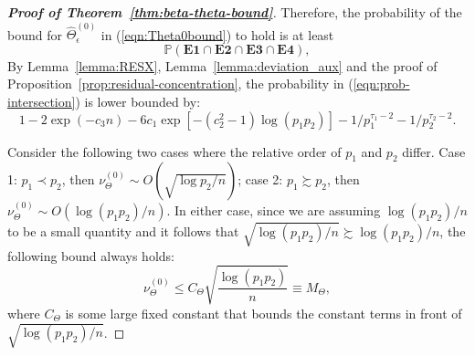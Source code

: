 \begin{proof}[\textbf{Proof of Theorem~\ref{thm:beta-theta-bound}}]
Therefore, the probability of the bound for $\widehat{\Theta}_\epsilon^{(0)}$ in (\ref{eqn:Theta0bound}) to hold is at least
\begin{equation}\label{eqn:prob-intersection}
\mathbb{P}\left(\mathbf{E1}\cap \mathbf{E2} \cap \mathbf{E3} \cap \mathbf{E4}\right),
\end{equation}
By Lemma~\ref{lemma:RESX}, Lemma~\ref{lemma:deviation_aux} and the proof of Proposition~\ref{prop:residual-concentration}, the probability in (\ref{eqn:prob-intersection}) is lower bounded by:
\begin{equation*}
1-2\exp(-c_3n) - 6c_1\exp[-(c_2^2-1)\log (p_1p_2)]-1/p_1^{\tau_1-2}-1/p_2^{\tau_2-2}.
\end{equation*}

Consider the following two cases where the relative order of $p_1$ and $p_2$ differ. Case 1: $p_1\prec p_2$, then $\nu_\Theta^{(0)}\sim O(\sqrt{\log p_2/n})$; case 2: $p_1\succsim p_2$, then $\nu_\Theta^{(0)}\sim O\left(\log(p_1p_2)/n\right)$. In either case, since we are assuming $\log(p_1p_2)/n$ to be a small quantity and it follows that $\sqrt{\log(p_1p_2)/n}\succsim \log(p_1p_2)/n$, the following bound always holds: 
\begin{equation*}
\nu_\Theta^{(0)} \leq C_\Theta \sqrt{\frac{\log(p_1p_2)}{n}} \equiv  M_\Theta,
\end{equation*}
where $C_\Theta$ is some large fixed constant that bounds the constant terms in front of $\sqrt{\log(p_1p_2)/n}$.



\end{proof}
